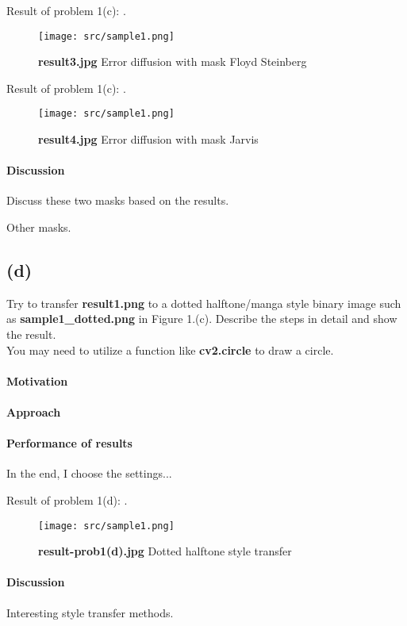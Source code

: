 Result of problem 1(c): .
\begin{figure}
    \centering
    \texttt{[image: src/sample1.png]}
    \caption{\textbf{result3.jpg} Error diffusion with mask Floyd Steinberg}
    \label{result3}
\end{figure}

Result of problem 1(c): .
\begin{figure}
    \centering
    \texttt{[image: src/sample1.png]}
    \caption{\textbf{result4.jpg} Error diffusion with mask Jarvis}
    \label{result4}
\end{figure}

\paragraph{Discussion}
Discuss these two masks based on the results.

Other masks.

\subsection{(d)}\label{1_d}
Try to transfer \textbf{result1.png} to a dotted halftone/manga style binary image such as \textbf{sample1\_dotted.png} in Figure 1.(c). Describe the steps in detail and show the result. \\
You may need to utilize a function like \textbf{cv2.circle} to draw a circle.

\paragraph{Motivation}

\paragraph{Approach}

\paragraph{Performance of results}
In the end, I choose the \alert{settings}...

Result of problem 1(d): .
\begin{figure}
    \centering
    \texttt{[image: src/sample1.png]}
    \caption{\textbf{result-prob1(d).jpg} Dotted halftone style transfer}
    \label{result-prob1(d)}
\end{figure}

\paragraph{Discussion}
Interesting style transfer methods.
